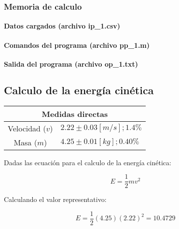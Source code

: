\documentclass[letter,11pt]{article}
\begin{document}
\subsubsection{Memoria de calculo}

\paragraph{Datos cargados (archivo ip\_1.csv)}
\begin{alltt}
\footnotesize

\normalsize
\end{alltt}

\paragraph{Comandos del programa (archivo pp\_1.m)}
\begin{alltt}
\footnotesize

\normalsize
\end{alltt}

\paragraph{Salida del programa (archivo op\_1.txt)}
\begin{alltt}
\footnotesize

\normalsize
\end{alltt}

\subsection{Calculo de la energía cinética}

\begin{center}
\begin{tabular}{|c|>{\centering}m{5.0cm}<{\centering}|}
\hline
\multicolumn{2}{|c|}{\textbf{Medidas directas}}
\tabularnewline \hline
Velocidad ($v$) & $2.22 \pm 0.03 [m/s]; 1.4\%$
\tabularnewline \hline
Masa ($m$) & $4.25 \pm 0.01 [kg]; 0.40\%$
\tabularnewline \hline
\end{tabular}
\end{center}

Dadas las ecuación para el calculo de la energía cinética:

\begin{equation}
    E = \frac{1}{2} m v^2
\end{equation}

Calculando el valor representativo:

\begin{equation*}
    E = \frac{1}{2}(4.25)(2.22)^2 = 10.4729
\end{equation*}
\end{document}
